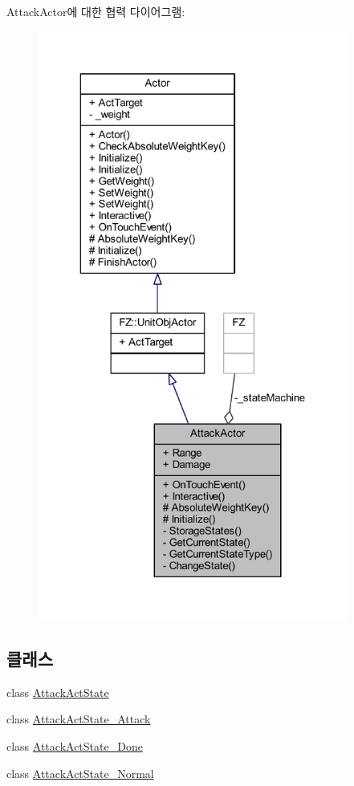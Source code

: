 Attack\+Actor에 대한 협력 다이어그램\+:
\nopagebreak
\begin{figure}[H]
\begin{center}
\leavevmode
\includegraphics[height=550pt]{class_attack_actor__coll__graph}
\end{center}
\end{figure}
\subsection*{클래스}
\begin{DoxyCompactItemize}
\item 
class \hyperlink{class_attack_actor_1_1_attack_act_state}{Attack\+Act\+State}
\item 
class \hyperlink{class_attack_actor_1_1_attack_act_state___attack}{Attack\+Act\+State\+\_\+\+Attack}
\item 
class \hyperlink{class_attack_actor_1_1_attack_act_state___done}{Attack\+Act\+State\+\_\+\+Done}
\item 
class \hyperlink{class_attack_actor_1_1_attack_act_state___normal}{Attack\+Act\+State\+\_\+\+Normal}
\end{DoxyCompactItemize}
